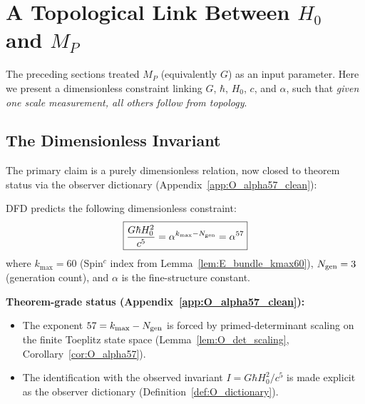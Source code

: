 \section{A Topological Link Between $H_0$ and $M_P$}\label{sec:G-derivation}

The preceding sections treated $M_P$ (equivalently $G$) as an input parameter. Here we present a dimensionless constraint linking $G$, $\hbar$, $H_0$, $c$, and $\alpha$, such that \textit{given one scale measurement, all others follow from topology}.

\subsection{The Dimensionless Invariant}

The primary claim is a purely dimensionless relation, now closed to theorem status via the observer dictionary (Appendix~\ref{app:O_alpha57_clean}):

\begin{proposition}\label{prop:invariant}
DFD predicts the following dimensionless constraint:
\begin{equation}
\boxed{\frac{G\hbar H_0^2}{c^5} = \alpha^{k_{\max} - N_{\rm gen}} = \alpha^{57}}
\label{eq:invariant}
\end{equation}
where $k_{\max} = 60$ (Spin$^c$ index from Lemma~\ref{lem:E_bundle_kmax60}), $N_{\rm gen} = 3$ (generation count), and $\alpha$ is the fine-structure constant.

\textbf{Theorem-grade status (Appendix~\ref{app:O_alpha57_clean}):}
\begin{itemize}
\item The exponent $57 = k_{\max} - N_{\rm gen}$ is forced by primed-determinant scaling on the finite Toeplitz state space (Lemma~\ref{lem:O_det_scaling}, Corollary~\ref{cor:O_alpha57}).
\item The identification with the observed invariant $I = G\hbar H_0^2/c^5$ is made explicit as the observer dictionary (Definition~\ref{def:O_dictionary}).
\end{itemize}
\end{proposition}

